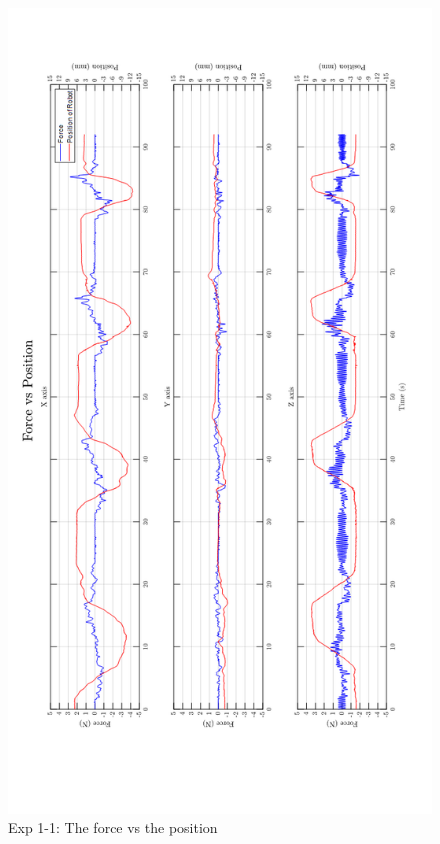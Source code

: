 \begin{figure}[htbp]
\begin{center}
\includegraphics[width=1\linewidth]{Images/exp/exp1_1_3.png}
\caption{Exp 1-1: The force vs the position}
\label{fig: exp1_1_3}
\end{center}
\end{figure}	
